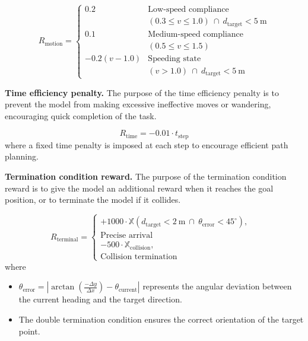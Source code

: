 \documentclass[lettersize,journal]{IEEEtran}
\begin{document}
\begin{equation}
	R_{\text{motion}} =
	\begin{cases}
		0.2 & \text{Low-speed compliance}\\&(0.3 \leq v \leq 1.0)\ \cap\ d_{\text{target}} < 5\ \text{m} \\
		0.1 & \text{Medium-speed compliance}\\&(0.5 \leq v \leq 1.5) \\
		-0.2(v-1.0) & \text{Speeding state} \\& (v > 1.0)\ \cap\ d_{\text{target}} < 5\ \text{m}
	\end{cases}
\end{equation}


\textbf{Time efficiency penalty.}
%
The purpose of the time efficiency penalty is to prevent the model from making excessive ineffective moves or wandering, encouraging quick completion of the task.

\begin{equation}
	R_{\text{time}} = -0.01 \cdot t_{\text{step}}
\end{equation}
where a fixed time penalty is imposed at each step to encourage efficient path planning.



\textbf{Termination condition reward.}
%
The purpose of the termination condition reward is to give the model an additional reward when it reaches the goal position, or to terminate the model if it collides.

\begin{equation}
	R_{\text{terminal}} =
	\begin{cases}
		+1000 \cdot \mathbb{X}(d_{\text{target}} < 2\ \text{m}\ \cap\ \theta_{\text{error}} < 45^\circ), & \\ \text{Precise arrival} \\
		-500 \cdot \mathbb{X}_{\text{collision}}, & \\ \text{Collision termination}
	\end{cases}
\end{equation}
where 
\begin{itemize}
	\item \( \theta_{\text{error}} = \left| \arctan\left(\frac{-\Delta y}{\Delta x}\right) - \theta_{\text{current}} \right| \) represents the angular deviation between the current heading and the target direction.
	\item The double termination condition ensures the correct orientation of the target point.
\end{itemize}
\end{document}
